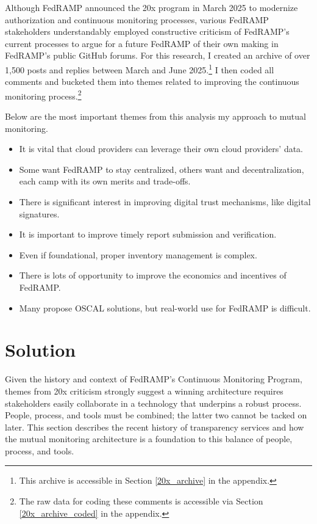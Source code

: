 \documentclass{jdf}
\begin{document}
Although FedRAMP announced the 20x program in March 2025 to modernize authorization and continuous monitoring processes, various FedRAMP stakeholders understandably employed constructive criticism of FedRAMP's current processes to argue for a future FedRAMP of their own making in FedRAMP's public GitHub forums. For this research, I created an archive of over 1,500 posts and replies between March and June 2025.\footnote{This archive is accessible in Section \ref{20x_archive} in the appendix.} I then coded all comments and bucketed them into themes related to improving the continuous monitoring process.\footnote{The raw data for coding these comments is accessible via Section \ref{20x_archive_coded} in the appendix.}

Below are the most important themes from this analysis my approach to mutual monitoring.

\begin{itemize}
    \item It is vital that cloud providers can leverage their own cloud providers' data.
    \item Some want FedRAMP to stay centralized, others want and decentralization, each camp with its own merits and trade-offs.
    \item There is significant interest in improving digital trust mechanisms, like digital signatures.
    \item It is important to improve timely report submission and verification.
    \item Even if foundational, proper inventory management is complex.
    \item There is lots of opportunity to improve the economics and incentives of FedRAMP.
    \item Many propose OSCAL solutions, but real-world use for FedRAMP is difficult.
\end{itemize}

\section{Solution}

Given the history and context of FedRAMP's Continuous Monitoring Program, themes from 20x criticism strongly suggest a winning architecture requires stakeholders easily collaborate in a technology that underpins a robust process. People, process, and tools must be combined; the latter two cannot be tacked on later. This section describes the recent history of transparency services and how the mutual monitoring architecture is a foundation to this balance of people, process, and tools.
\end{document}
